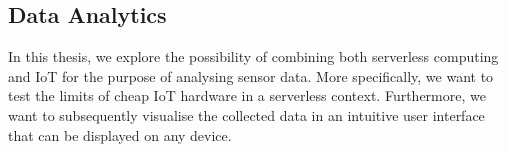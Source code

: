 \subsection{Data Analytics}

In this thesis, we explore the possibility of combining both serverless computing and IoT for the
purpose of analysing sensor data. More specifically, we want to test the limits of cheap IoT
hardware in a serverless context. Furthermore, we want to subsequently visualise the collected
data in an intuitive user interface that can be displayed on any device.
